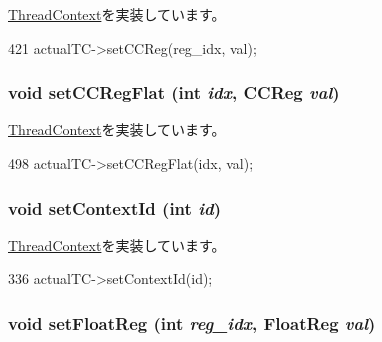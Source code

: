 \hyperlink{classThreadContext_a276736f0c1f99f27ed95348979e8b8c6}{ThreadContext}を実装しています。


\begin{DoxyCode}
421     { actualTC->setCCReg(reg_idx, val); }
\end{DoxyCode}
\hypertarget{classProxyThreadContext_a6dec2284dd5904f992642f24bb289f14}{
\subsubsection[{setCCRegFlat}]{\setlength{\rightskip}{0pt plus 5cm}void setCCRegFlat (int {\em idx}, \/  {\bf CCReg} {\em val})}}
\label{classProxyThreadContext_a6dec2284dd5904f992642f24bb289f14}


\hyperlink{classThreadContext_ab1028831649236bd6f229a4561663fd9}{ThreadContext}を実装しています。


\begin{DoxyCode}
498     { actualTC->setCCRegFlat(idx, val); }
\end{DoxyCode}
\hypertarget{classProxyThreadContext_a0dd10037a5b0eadaddfe7c67d52d3ac6}{
\subsubsection[{setContextId}]{\setlength{\rightskip}{0pt plus 5cm}void setContextId (int {\em id})}}
\label{classProxyThreadContext_a0dd10037a5b0eadaddfe7c67d52d3ac6}


\hyperlink{classThreadContext_a60a9383e4a460807756f2de9f5215582}{ThreadContext}を実装しています。


\begin{DoxyCode}
336 { actualTC->setContextId(id); }
\end{DoxyCode}
\hypertarget{classProxyThreadContext_ab6fd8e55b81c173f448ec0c42bc28b99}{
\subsubsection[{setFloatReg}]{\setlength{\rightskip}{0pt plus 5cm}void setFloatReg (int {\em reg\_\-idx}, \/  {\bf FloatReg} {\em val})}}
\label{classProxyThreadContext_ab6fd8e55b81c173f448ec0c42bc28b99}


